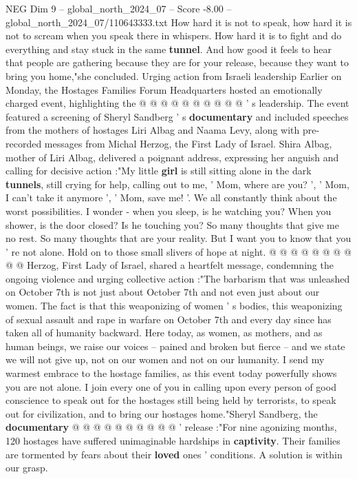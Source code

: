 \begin{textsample}{NEG Dim 9 – global\_north\_2024\_07 – Score -8.00 – global\_north\_2024\_07/110643333.txt}
How hard it is not to speak, how hard it is not to scream when you speak there in whispers.
How hard it is to fight and do everything and stay stuck in the same \textbf{tunnel}.
And how good it feels to hear that people are gathering because they are for your release, because they want to bring you home,"she concluded.
Urging action from Israeli leadership Earlier on Monday, the Hostages Families Forum Headquarters hosted an emotionally charged event, highlighting the @ @ @ @ @ @ @ @ @ @ ' s leadership.
The event featured a screening of Sheryl Sandberg ' s \textbf{documentary} and included speeches from the mothers of hostages Liri Albag and Naama Levy, along with pre-recorded messages from Michal Herzog, the First Lady of Israel.
Shira Albag, mother of Liri Albag, delivered a poignant address, expressing her anguish and calling for decisive action :"My little \textbf{girl} is still sitting alone in the dark \textbf{tunnels}, still crying for help, calling out to me, ' Mom, where are you? ', ' Mom, I can't take it anymore ', ' Mom, save me! '.
We all constantly think about the worst possibilities.
I wonder - when you sleep, is he watching you?
When you shower, is the door closed?
Is he touching you?
So many thoughts that give me no rest.
So many thoughts that are your reality.
But I want you to know that you ' re not alone.
Hold on to those small slivers of hope at night. @ @ @ @ @ @ @ @ @ @ Herzog, First Lady of Israel, shared a heartfelt message, condemning the ongoing violence and urging collective action :"The barbarism that was unleashed on October 7th is not just about October 7th and not even just about our women.
The fact is that this weaponizing of women ' s bodies, this weaponizing of sexual assault and rape in warfare on October 7th and every day since has taken all of humanity backward.
Here today, as women, as mothers, and as human beings, we raise our voices -- pained and broken but fierce -- and we state we will not give up, not on our women and not on our humanity.
I send my warmest embrace to the hostage families, as this event today powerfully shows you are not alone.
I join every one of you in calling upon every person of good conscience to speak out for the hostages still being held by terrorists, to speak out for civilization, and to bring our hostages home."Sheryl Sandberg, the \textbf{documentary} @ @ @ @ @ @ @ @ @ @ ' release :"For nine agonizing months, 120 hostages have suffered unimaginable hardships in \textbf{captivity}.
Their families are tormented by fears about their \textbf{loved} ones ' conditions.
A solution is within our grasp.

\end{textsample}
